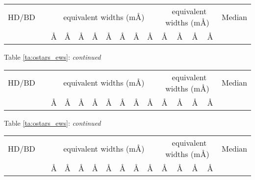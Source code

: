 \newcommand{\tabhead}{
\multicolumn{1}{c}{HD/BD} & \multicolumn{1}{c}{} & 
\multicolumn{8}{c}{\hei\ equivalent widths (m\AA)} &
\multicolumn{4}{c}{\heii\ equivalent widths (m\AA)} &
\multicolumn{2}{c}{Median} \\
\multicolumn{2}{c}{} & \lam4009\AA & \lam4026\AA & \lam4143\AA & 
\lam4388\AA & \lam4471\AA & \lam4713\AA & \lam4922\AA &
\multicolumn{1}{c}{\lam5047\AA} &
\lam4200\AA & \lam4541\AA & \lam4686\AA &
\multicolumn{1}{c}{\lam5411\AA} & \hei & \heii \\
}
\begin{sidewaystable}
\scriptsize
\begin{center}
\caption{Measured and calculated equivalent widths}
\vspace{\abovecaptionskip}
\begin{tabular}{lc|cccccccc|cccc|cc}
\hline\hline
\tabhead
\hline

\end{tabular}
\label{ta:ostars_ews}
\end{center}
\end{sidewaystable} 

\begin{sidewaystable} 
\scriptsize
\begin{center}
Table \ref{ta:ostars_ews}: \emph{continued}\\
\vspace{\abovecaptionskip}
\begin{tabular}{lc|cccccccc|cccc|cc}
\hline\hline
\tabhead
\hline

\end{tabular}
\end{center}
\end{sidewaystable} 

\begin{sidewaystable} 
\scriptsize
\begin{center}
Table \ref{ta:ostars_ews}: \emph{continued}\\
\vspace{\abovecaptionskip}
\begin{tabular}{lc|cccccccc|cccc|cc}
\hline\hline
\tabhead
\hline

\hline\hline
\end{tabular}
\end{center}
\end{sidewaystable} 


